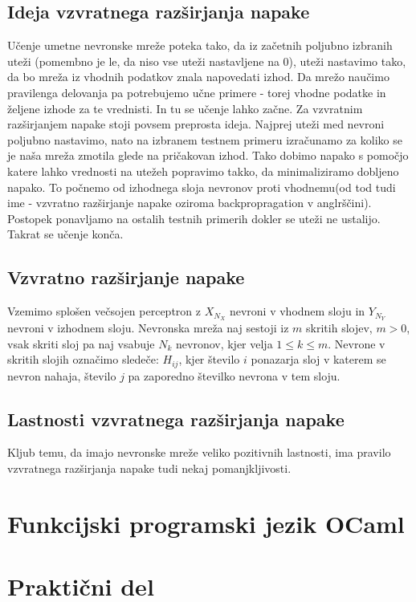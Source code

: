 \documentclass[mat1]{fmfdelo}
\begin{document}
\subsection{Ideja vzvratnega razširjanja napake}
Učenje umetne nevronske mreže poteka tako, da iz začetnih poljubno izbranih uteži (pomembno je le, da niso vse uteži nastavljene na 0), uteži nastavimo tako, da bo mreža iz vhodnih podatkov znala napovedati izhod. Da mrežo naučimo pravilenga delovanja pa potrebujemo učne primere - torej vhodne podatke in željene izhode za te vrednisti. In tu se učenje lahko začne.
Za vzvratnim razširjanjem napake stoji povsem preprosta ideja. Najprej uteži med nevroni poljubno nastavimo, nato na izbranem testnem primeru izračunamo za koliko se je naša mreža zmotila glede na pričakovan izhod. Tako dobimo napako s pomočjo katere lahko  vrednosti na utežeh popravimo takko, da minimaliziramo dobljeno napako. To počnemo od izhodnega sloja nevronov proti vhodnemu(od tod tudi ime -  vzvratno razširjanje napake oziroma backpropragation v anglrščini). Postopek ponavljamo na ostalih testnih primerih dokler se uteži ne ustalijo. Takrat se učenje konča.

\subsection{Vzvratno razširjanje napake}


Vzemimo splošen večsojen perceptron z $X_{N_X}$ nevroni v vhodnem sloju in $Y_{N_Y}$ nevroni v izhodnem sloju. Nevronska mreža naj sestoji iz $m$ skritih slojev, $m>0$, vsak skriti sloj pa naj vsabuje $N_k$ nevronov, kjer velja $1\leq k \leq m$. Nevrone v skritih slojih označimo sledeče: $H_{ij}$, kjer število $i$ ponazarja sloj v katerem se nevron nahaja, število $j$ pa zaporedno številko nevrona v tem sloju. 

\subsection{Lastnosti vzvratnega razširjanja napake}
Kljub temu, da imajo nevronske mreže veliko pozitivnih lastnosti, ima pravilo vzvratnega razširjanja napake tudi nekaj pomanjkljivosti.



\section{Funkcijski programski jezik OCaml}

\section{Praktični del}
\end{document}
